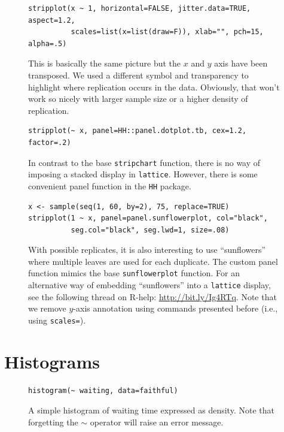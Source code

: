 \documentclass[a4paper,twoside]{book}
\newcounter{fig}
\newcommand{\img}[1]{\texttt{[image: \#1]}\stepcounter{fig}}
\renewcommand{\texttt}[1]{\lstinline{#1}}
\newcommand{\mytilde}{\textcolor{myred3}{$\sim$}\xspace}
\begin{document}
\begin{figure}[H]
\begin{lstlisting}
stripplot(x ~ 1, horizontal=FALSE, jitter.data=TRUE, aspect=1.2,
          scales=list(x=list(draw=F)), xlab="", pch=15, alpha=.5)
\end{lstlisting}
  \fcapside[\FBwidth] {\img{figs_lattice-crop}}
  {\caption*{This is basically the same picture but the $x$ and $y$
      axis have been transposed. We used a different symbol and
      transparency to highlight where replication occurs in the
      data. Obviously, that won't work so nicely with larger sample
      size or a higher density of replication.}}
\end{figure}

\begin{figure}[H]
\begin{lstlisting}
stripplot(~ x, panel=HH::panel.dotplot.tb, cex=1.2, factor=.2)
\end{lstlisting}
  \fcapside[\FBwidth] {\img{figs_lattice-crop}} {\caption*{In contrast
      to the base \texttt{stripchart} function, there is no way of
      imposing a stacked display in \texttt{lattice}. However, there
      is some convenient panel function in the \texttt{HH} package.}}
\end{figure}

\begin{figure}[H]
\begin{lstlisting}
x <- sample(seq(1, 60, by=2), 75, replace=TRUE)
stripplot(1 ~ x, panel=panel.sunflowerplot, col="black", 
          seg.col="black", seg.lwd=1, size=.08)
\end{lstlisting}
  \fcapside[\FBwidth] {\img{figs_lattice-crop}} {\caption*{With
      possible replicates, it is also interesting to use
      ``sunflowers'' where multiple leaves are used for each
      duplicate. The custom panel function mimics the base
      \texttt{sunflowerplot} function. For an alternative way of
      embedding ``sunflowers'' into a \texttt{lattice} display, see
      the following thread on R-help: \url{http://bit.ly/Ig4RTq}. Note
      that we remove $y$-axis annotation using commands presented
      before (i.e., using \texttt{scales=}).}}
\end{figure}

\section{Histograms}
\lipsum[1]

\begin{figure}[H]
\begin{lstlisting}
histogram(~ waiting, data=faithful)
\end{lstlisting}
  \fcapside[\FBwidth] {\img{figs_lattice-crop}}
  {\caption*{A
      simple histogram of waiting time expressed as density. Note that
      forgetting the \mytilde operator will raise an error message.}}
\end{figure}
\end{document}

